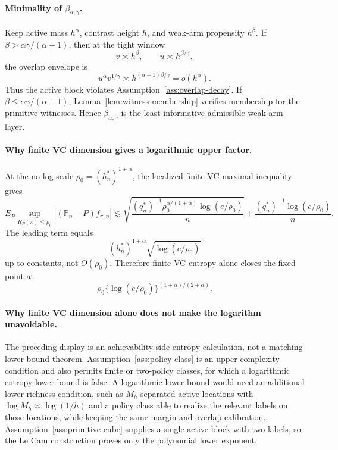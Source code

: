 \documentclass[11pt]{article}
\theoremstyle{definition}
\theoremstyle{plain}
\theoremstyle{remark}
\begin{document}
\paragraph{Minimality of \(\beta_{\alpha,\gamma}\).}
Keep active mass \(h^\alpha\), contrast height \(h\), and weak-arm propensity
\(h^\beta\).  If \(\beta>\alpha\gamma/(\alpha+1)\), then at the tight window
\[
v\asymp h^\beta,\qquad u\asymp h^{\beta/\gamma},
\]
the overlap envelope is
\[
u^\alpha v^{1/\gamma}
\asymp h^{(\alpha+1)\beta/\gamma}
=o(h^\alpha).
\]
Thus the active block violates Assumption~\ref{ass:overlap-decay}.  If
\(\beta\le\alpha\gamma/(\alpha+1)\), Lemma~\ref{lem:witness-membership}
verifies membership for the primitive witnesses.  Hence
\(\beta_{\alpha,\gamma}\) is the least informative admissible weak-arm layer.

\paragraph{Why finite VC dimension gives a logarithmic upper factor.}
At the no-log scale \(\rho_0=(h_n^*)^{1+\alpha}\), the localized finite-VC
maximal inequality gives
\[
E_P\sup_{R_P(\pi)\le\rho_0}
|(\mathbb P_n-P)f_{\pi,n}|
\lesssim
\sqrt{\frac{(q_n^*)^{-1}\rho_0^{\alpha/(1+\alpha)}
\log(e/\rho_0)}{n}}
+
\frac{(q_n^*)^{-1}\log(e/\rho_0)}{n}.
\]
The leading term equals
\[
(h_n^*)^{1+\alpha}\sqrt{\log(e/\rho_0)}
\]
up to constants, not \(O(\rho_0)\).  Therefore finite-VC entropy alone closes
the fixed point at
\[
\rho_0\{\log(e/\rho_0)\}^{(1+\alpha)/(2+\alpha)}.
\]

\paragraph{Why finite VC dimension alone does not make the logarithm unavoidable.}
The preceding display is an achievability-side entropy calculation, not a
matching lower-bound theorem.  Assumption~\ref{ass:policy-class} is an upper
complexity condition and also permits finite or two-policy classes, for which
a logarithmic entropy lower bound is false.  A logarithmic lower bound would
need an additional lower-richness condition, such as \(M_h\) separated active
locations with \(\log M_h\asymp\log(1/h)\) and a policy class able to realize
the relevant labels on those locations, while keeping the same margin and
overlap calibration.  Assumption~\ref{ass:primitive-cube} supplies a single
active block with two labels, so the Le Cam construction proves only the
polynomial lower exponent.
\end{document}
